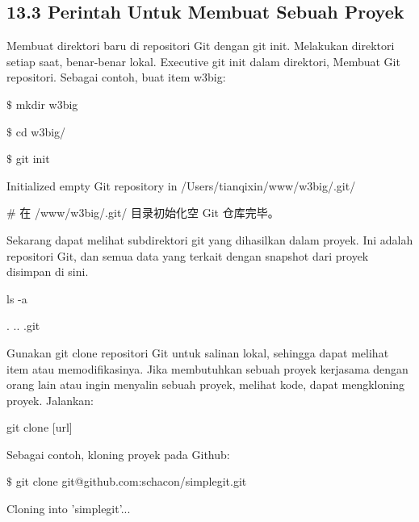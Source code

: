 \subsection*{13.3 Perintah Untuk Membuat Sebuah Proyek }
 \par
\vspace{12pt}
Membuat direktori baru di repositori Git dengan git init. Melakukan direktori setiap saat, benar-benar lokal. Executive git init dalam direktori, Membuat Git repositori. Sebagai contoh, buat item w3big:  \par
\noindent 
{\fontsize{10pt}{10pt}\selectfont  $  \$  $ mkdir w3big} \par
\noindent 
{\fontsize{10pt}{10pt}\selectfont  $  \$  $ cd w3big/} \par
\noindent 
{\fontsize{10pt}{10pt}\selectfont  $  \$  $ git init} \par
\noindent 
{\fontsize{10pt}{10pt}\selectfont Initialized empty Git repository in /Users/tianqixin/www/w3big/.git/} \par
\noindent 
{\fontsize{10pt}{10pt}\selectfont  $  \#  $ 在 /www/w3big/.git/ 目录初始化空 Git 仓库完毕。} \par
\vspace{14pt}
Sekarang dapat melihat subdirektori git yang dihasilkan dalam proyek. Ini adalah repositori Git, dan semua data yang terkait dengan snapshot dari proyek disimpan di sini. \par
\noindent 
{\fontsize{10pt}{10pt}\selectfont ls -a} \par
\noindent 
{\fontsize{10pt}{10pt}\selectfont . \hspace*{0.64in} .. \hspace*{0.64in} .git} \par
\vspace{12pt}
Gunakan git clone repositori Git untuk salinan lokal, sehingga dapat melihat item atau memodifikasinya. Jika membutuhkan sebuah proyek kerjasama dengan orang lain atau ingin menyalin sebuah proyek, melihat kode, dapat mengkloning proyek. Jalankan:  \par
\noindent 
{\fontsize{10pt}{10pt}\selectfont git clone [url]} \par
\vspace{12pt}
\noindent 
Sebagai contoh, kloning proyek pada Github: \par
\noindent 
{\fontsize{10pt}{10pt}\selectfont  $  \$  $ git clone git@github.com:schacon/simplegit.git} \par
\noindent 
{\fontsize{10pt}{10pt}\selectfont Cloning into 'simplegit'...} \par
